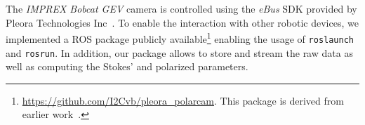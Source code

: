 

The \emph{IMPREX Bobcat GEV} camera is controlled using the \emph{eBus} SDK
provided by Pleora Technologies Inc~\cite{eBus}. To enable the interaction with
other robotic devices, we implemented a ROS package publicly
available\footnote{\url{https://github.com/I2Cvb/pleora_polarcam}. This package
  is derived from earlier work~\cite{ira}.} enabling the usage of
\texttt{roslaunch} and \texttt{rosrun}. In addition, our package allows to
store and stream the raw data as well as computing the Stokes' and polarized
parameters.




